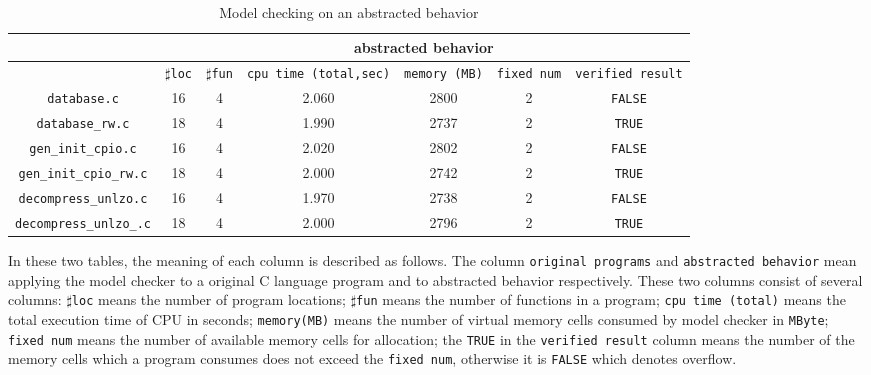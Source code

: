 \begin{table}
  \scriptsize
\begin{tabular}{|c|c|c|c|c|c|c|}
\hline
&\multicolumn{6}{|c|}{abstracted behavior} \\
\hline
 &$\sharp$\texttt{loc} & $\sharp$\texttt{fun} & \texttt{cpu time (total,sec)} & \texttt{memory (MB)} & \texttt{fixed num} & \texttt{verified result} \\
\hline
\texttt{database.c} &  16 & 4 & 2.060 & 2800 & 2 & \texttt{FALSE} \\
\hline
\texttt{database\_rw.c} &  18 & 4 & 1.990 & 2737 & 2 & \texttt{TRUE} \\
\hline
\texttt{gen\_init\_cpio.c} & 16 & 4 & 2.020 & 2802 & 2  & \texttt{FALSE}  \\
\hline
\texttt{gen\_init\_cpio\_rw.c} & 18 & 4 & 2.000  & 2742  & 2  & \texttt{TRUE}  \\
\hline
\texttt{decompress\_unlzo.c} & 16 & 4 & 1.970  & 2738  & 2  & \texttt{FALSE}  \\
\hline
\texttt{decompress\_unlzo\_.c} & 18 & 4  & 2.000  & 2796  & 2  & \texttt{TRUE}  \\

\hline
\end{tabular}
\caption{Model checking on an abstracted behavior}
\label{tb:mca}
\end{table}

In these two tables, the meaning of each column is described as
follows. The column \texttt{original programs} and \texttt{abstracted
  behavior} mean applying the model checker to a original C language
program and to abstracted behavior respectively. These two columns
consist of several columns: $\sharp$\texttt{loc} means the number of
program locations; $\sharp$\texttt{fun} means the number of functions
in a program; \texttt{cpu time (total)} means the total execution time
of CPU in seconds; \texttt{memory(MB)} means the number of virtual
memory cells consumed by model checker in \texttt{MByte};
\texttt{fixed num} means the number of available memory cells for
allocation; the \texttt{TRUE} in the \texttt{verified result} column
means the number of the memory cells which a program consumes does not
exceed the \texttt{fixed num}, otherwise it is \texttt{FALSE} which
denotes overflow.


